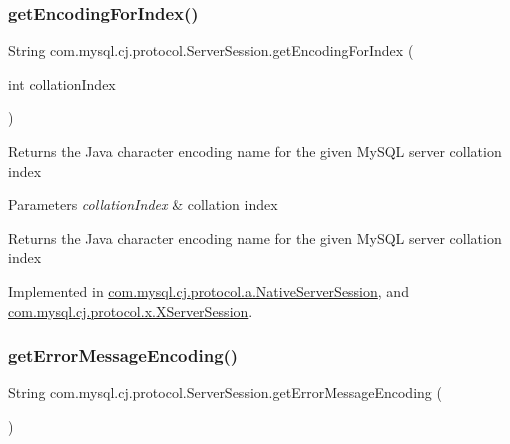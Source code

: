 \subsubsection{\texorpdfstring{get\+Encoding\+For\+Index()}{getEncodingForIndex()}}
{\footnotesize\ttfamily String com.\+mysql.\+cj.\+protocol.\+Server\+Session.\+get\+Encoding\+For\+Index (\begin{DoxyParamCaption}\item[{int}]{collation\+Index }\end{DoxyParamCaption})}

Returns the Java character encoding name for the given My\+S\+QL server collation index


\begin{DoxyParams}{Parameters}
{\em collation\+Index} & collation index \\
\hline
\end{DoxyParams}
\begin{DoxyReturn}{Returns}
the Java character encoding name for the given My\+S\+QL server collation index 
\end{DoxyReturn}


Implemented in \mbox{\hyperlink{classcom_1_1mysql_1_1cj_1_1protocol_1_1a_1_1_native_server_session_a3a9d807f5e66892f234d06934d275de1}{com.\+mysql.\+cj.\+protocol.\+a.\+Native\+Server\+Session}}, and \mbox{\hyperlink{classcom_1_1mysql_1_1cj_1_1protocol_1_1x_1_1_x_server_session_a3184e5a4acad8af656fb72a6b57a5fa8}{com.\+mysql.\+cj.\+protocol.\+x.\+X\+Server\+Session}}.

\mbox{\label{interfacecom_1_1mysql_1_1cj_1_1protocol_1_1_server_session_af83c1d2cdc8e37e3c916ee435ff0af71}} 
\subsubsection{\texorpdfstring{get\+Error\+Message\+Encoding()}{getErrorMessageEncoding()}}
{\footnotesize\ttfamily String com.\+mysql.\+cj.\+protocol.\+Server\+Session.\+get\+Error\+Message\+Encoding (\begin{DoxyParamCaption}{ }\end{DoxyParamCaption})}



